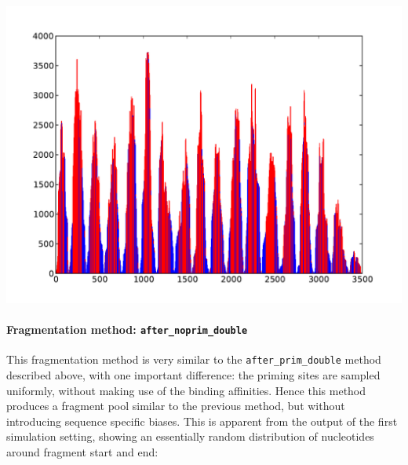 \begin{center}
\includegraphics[scale=0.6,page=1]{../src/test/cov/cov_after_prim_double.pdf}
\end{center}


\paragraph{{Fragmentation method: }\texttt{after\_noprim\_double}}

This fragmentation method is very similar to the \texttt{after\_prim\_double} method described above, with one important difference: the priming sites are sampled uniformly, without making use of the binding affinities. Hence this method produces a fragment pool similar to the previous method, but without introducing sequence specific biases. This is apparent from the output of the first simulation setting, showing an essentially random distribution of nucleotides around fragment start and end:

